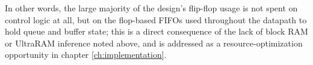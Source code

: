 In other words, the large majority of the design's flip-flop usage is not spent on control logic
at all, but on the flop-based FIFOs used throughout the datapath to hold queue and buffer state;
this is a direct consequence of the lack of block RAM or UltraRAM inference noted above, and is
addressed as a resource-optimization opportunity in chapter \ref{ch:implementation}.


